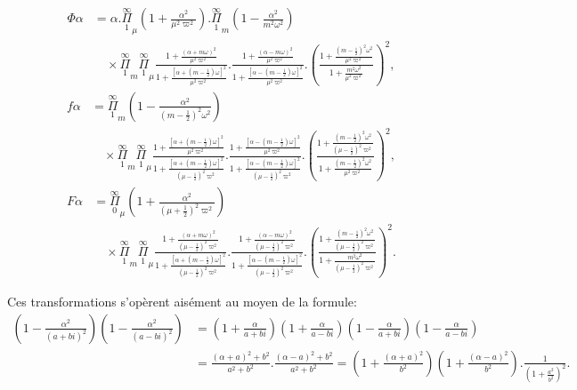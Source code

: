 \documentclass{article}
\begin{document}
\[
\begin{aligned}
\Phi\alpha &= \alpha.\overset{\infty}{\underset{1}{\Pi}}_{\mu}\left(1+\frac{\alpha^{2}}{\mu^{2}\varpi^{2}}\right).\overset{\infty}{\underset{1}{\Pi}}_{m}\left(1-\frac{\alpha^{2}}{m^{2}\omega^{2}}\right)\\
&\quad\times\overset{\infty}{\underset{1}{\Pi}}_{m}\overset{\infty}{\underset{1}{\Pi}}_{\mu}\frac{1+\frac{(\alpha+m\omega)^{2}}{\mu^{2}\varpi^{2}}}{1+\frac{[\alpha+(m-\tfrac{1}{2})\omega]^{2}}{\mu^{2}\varpi^{2}}}.\frac{1+\frac{(\alpha-m\omega)^{2}}{\mu^{2}\varpi^{2}}}{1+\frac{[\alpha-(m-\tfrac{1}{2})\omega]^{2}}{\mu^{2}\varpi^{2}}}.\left(\frac{1+\frac{(m-\tfrac{1}{2})^{2}\omega^{2}}{\mu^{2}\varpi^{2}}}{1+\frac{m^{2}\omega^{2}}{\mu^{2}\varpi^{2}}}\right)^{2},
\end{aligned}
\tag{178.}
\]
\[
\begin{aligned}
f\alpha &= \overset{\infty}{\underset{1}{\Pi}}_{m}\left(1-\frac{\alpha^{2}}{(m-\tfrac{1}{2})^{2}\omega^{2}}\right)\\
&\quad\times\overset{\infty}{\underset{1}{\Pi}}_{m}\overset{\infty}{\underset{1}{\Pi}}_{\mu}\frac{1+\frac{[\alpha+(m-\tfrac{1}{2})\omega]^{2}}{\mu^{2}\varpi^{2}}}{1+\frac{[\alpha+(m-\tfrac{1}{2})\omega]^{2}}{(\mu-\tfrac{1}{2})^{2}\varpi^{2}}}.\frac{1+\frac{[\alpha-(m-\tfrac{1}{2})\omega]^{2}}{\mu^{2}\varpi^{2}}}{1+\frac{[\alpha-(m-\tfrac{1}{2})\omega]^{2}}{(\mu-\tfrac{1}{2})^{2}\varpi^{2}}}.\left(\frac{1+\frac{(m-\tfrac{1}{2})^{2}\omega^{2}}{(\mu-\tfrac{1}{2})^{2}\varpi^{2}}}{1+\frac{(m-\tfrac{1}{2})^{2}\omega^{2}}{\mu^{2}\varpi^{2}}}\right)^{2},
\end{aligned}
\tag{179.}
\]
\[
\begin{aligned}
F\alpha &= \overset{\infty}{\underset{0}{\Pi}}_{\mu}\left(1+\frac{\alpha^{2}}{(\mu+\tfrac{1}{2})^{2}\varpi^{2}}\right)\\
&\quad\times\overset{\infty}{\underset{1}{\Pi}}_{m}\overset{\infty}{\underset{1}{\Pi}}_{\mu}\frac{1+\frac{(\alpha+m\omega)^{2}}{(\mu-\tfrac{1}{2})^{2}\varpi^{2}}}{1+\frac{[\alpha+(m-\tfrac{1}{2})\omega]^{2}}{(\mu-\tfrac{1}{2})^{2}\varpi^{2}}}.\frac{1+\frac{(\alpha-m\omega)^{2}}{(\mu-\tfrac{1}{2})^{2}\varpi^{2}}}{1+\frac{[\alpha-(m-\tfrac{1}{2})\omega]^{2}}{(\mu-\tfrac{1}{2})^{2}\varpi^{2}}}.\left(\frac{1+\frac{(m-\tfrac{1}{2})^{2}\omega^{2}}{(\mu-\tfrac{1}{2})^{2}\varpi^{2}}}{1+\frac{m^{2}\omega^{2}}{(\mu-\tfrac{1}{2})^{2}\varpi^{2}}}\right)^{2}.
\end{aligned}
\tag{180.}
\]

Ces transformations s'opèrent aisément au moyen de la formule:
\[
\begin{aligned}
\left(1-\frac{\alpha^{2}}{(a+bi)^{2}}\right)\left(1-\frac{\alpha^{2}}{(a-bi)^{2}}\right) &= \left(1+\frac{\alpha}{a+bi}\right)\left(1+\frac{\alpha}{a-bi}\right)\left(1-\frac{\alpha}{a+bi}\right)\left(1-\frac{\alpha}{a-bi}\right)\\
&= \frac{(\alpha+a)^{2}+b^{2}}{a^{2}+b^{2}}.\frac{(\alpha-a)^{2}+b^{2}}{a^{2}+b^{2}} = \left(1+\frac{(\alpha+a)^{2}}{b^{2}}\right)\left(1+\frac{(\alpha-a)^{2}}{b^{2}}\right).\frac{1}{\left(1+\frac{a^{2}}{b^{2}}\right)^{2}}.
\end{aligned}
\]
\end{document}
